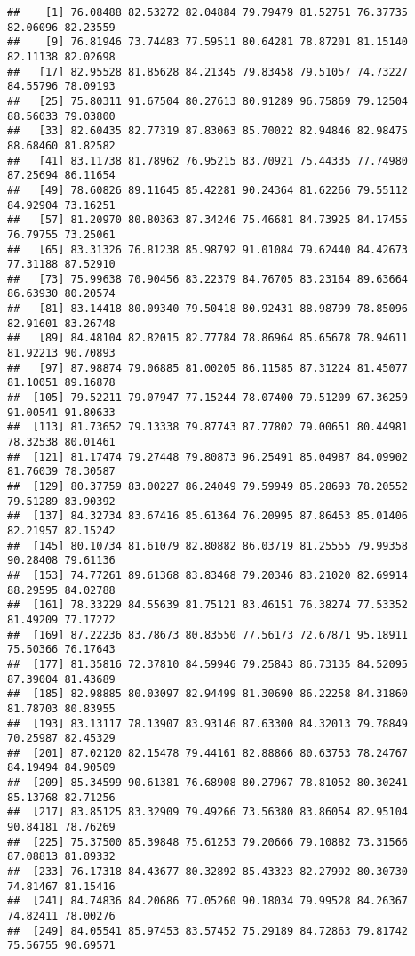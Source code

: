 \documentclass[
]{article}
\begin{document}
\begin{verbatim}
##    [1] 76.08488 82.53272 82.04884 79.79479 81.52751 76.37735 82.06096 82.23559
##    [9] 76.81946 73.74483 77.59511 80.64281 78.87201 81.15140 82.11138 82.02698
##   [17] 82.95528 81.85628 84.21345 79.83458 79.51057 74.73227 84.55796 78.09193
##   [25] 75.80311 91.67504 80.27613 80.91289 96.75869 79.12504 88.56033 79.03800
##   [33] 82.60435 82.77319 87.83063 85.70022 82.94846 82.98475 88.68460 81.82582
##   [41] 83.11738 81.78962 76.95215 83.70921 75.44335 77.74980 87.25694 86.11654
##   [49] 78.60826 89.11645 85.42281 90.24364 81.62266 79.55112 84.92904 73.16251
##   [57] 81.20970 80.80363 87.34246 75.46681 84.73925 84.17455 76.79755 73.25061
##   [65] 83.31326 76.81238 85.98792 91.01084 79.62440 84.42673 77.31188 87.52910
##   [73] 75.99638 70.90456 83.22379 84.76705 83.23164 89.63664 86.63930 80.20574
##   [81] 83.14418 80.09340 79.50418 80.92431 88.98799 78.85096 82.91601 83.26748
##   [89] 84.48104 82.82015 82.77784 78.86964 85.65678 78.94611 81.92213 90.70893
##   [97] 87.98874 79.06885 81.00205 86.11585 87.31224 81.45077 81.10051 89.16878
##  [105] 79.52211 79.07947 77.15244 78.07400 79.51209 67.36259 91.00541 91.80633
##  [113] 81.73652 79.13338 79.87743 87.77802 79.00651 80.44981 78.32538 80.01461
##  [121] 81.17474 79.27448 79.80873 96.25491 85.04987 84.09902 81.76039 78.30587
##  [129] 80.37759 83.00227 86.24049 79.59949 85.28693 78.20552 79.51289 83.90392
##  [137] 84.32734 83.67416 85.61364 76.20995 87.86453 85.01406 82.21957 82.15242
##  [145] 80.10734 81.61079 82.80882 86.03719 81.25555 79.99358 90.28408 79.61136
##  [153] 74.77261 89.61368 83.83468 79.20346 83.21020 82.69914 88.29595 84.02788
##  [161] 78.33229 84.55639 81.75121 83.46151 76.38274 77.53352 81.49209 77.17272
##  [169] 87.22236 83.78673 80.83550 77.56173 72.67871 95.18911 75.50366 76.17643
##  [177] 81.35816 72.37810 84.59946 79.25843 86.73135 84.52095 87.39004 81.43689
##  [185] 82.98885 80.03097 82.94499 81.30690 86.22258 84.31860 81.78703 80.83955
##  [193] 83.13117 78.13907 83.93146 87.63300 84.32013 79.78849 70.25987 82.45329
##  [201] 87.02120 82.15478 79.44161 82.88866 80.63753 78.24767 84.19494 84.90509
##  [209] 85.34599 90.61381 76.68908 80.27967 78.81052 80.30241 85.13768 82.71256
##  [217] 83.85125 83.32909 79.49266 73.56380 83.86054 82.95104 90.84181 78.76269
##  [225] 75.37500 85.39848 75.61253 79.20666 79.10882 73.31566 87.08813 81.89332
##  [233] 76.17318 84.43677 80.32892 85.43323 82.27992 80.30730 74.81467 81.15416
##  [241] 84.74836 84.20686 77.05260 90.18034 79.99528 84.26367 74.82411 78.00276
##  [249] 84.05541 85.97453 83.57452 75.29189 84.72863 79.81742 75.56755 90.69571

\end{verbatim}
\end{document}
